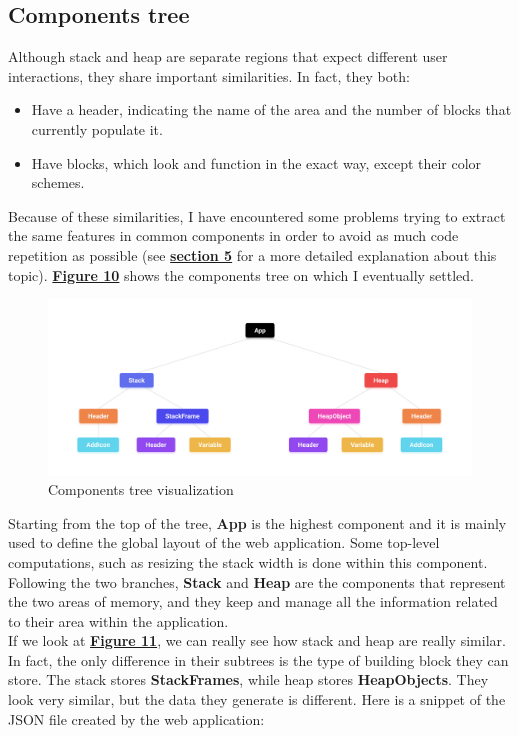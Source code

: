\documentclass[]{usiinfbachelorproject}
\begin{document}
\subsection{Components tree}

Although stack and heap are separate regions that expect different user interactions, they share important similarities. In fact, they both:

\begin{itemize}
	\item Have a header, indicating the name of the area and the number of blocks that currently populate it.
	\item Have blocks, which look and function in the exact way, except their color schemes.
\end{itemize}

\noindent Because of these similarities, I have encountered some problems trying to extract the same features in common components in order to avoid as much code repetition as possible (see \hyperref[]{\textbf{section 5}} for a more detailed explanation about this topic). \hyperref[tree]{\textbf{Figure 10}} shows the components tree on which I eventually settled.

\begin{figure}[h!]
\centering
\includegraphics[width=\textwidth]{figures/tree.png}
\caption {Components tree visualization}
\label{tree}
\end{figure}

\pagebreak

\noindent Starting from the top of the tree, \textbf{App} is the highest component and it is mainly used to define the global layout of the web application. Some top-level computations, such as resizing the stack width is done within this component.\\
Following the two branches, \textbf{Stack} and \textbf{Heap} are the components that represent the two areas of memory, and they keep and manage all the information related to their area within the application.\\
If we look at \textbf{\hyperref[tree]{Figure 11}}, we can really see how stack and heap are really similar. In fact, the only difference in their subtrees is the type of building block they can store. The stack stores \textbf{StackFrames}, while heap stores \textbf{HeapObjects}. They look very similar, but the data they generate is different. Here is a snippet of the JSON file created by the web application:\\
\end{document}
